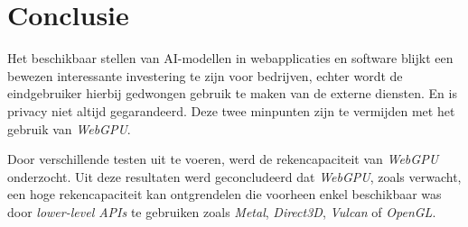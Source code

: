 
\chapter{Conclusie}%
\label{ch:conclusie}





\iffalse
TODO Samen hang moet worden verbetert, alle zaken die hier besproken zijn geweest moeten zeker aan bod zijn gekomen in het onderzoek! Al dan niet verder in detail bespreken.
\fi

Het beschikbaar stellen van AI-modellen in webapplicaties en software blijkt een bewezen interessante investering te zijn voor bedrijven, echter wordt de eindgebruiker hierbij gedwongen gebruik te maken van de externe diensten. En is privacy niet altijd gegarandeerd. Deze twee minpunten zijn te vermijden met het gebruik van \textit{WebGPU}.

\bigbreak{}

Door verschillende testen uit te voeren, werd de rekencapaciteit van \textit{WebGPU} onderzocht. Uit deze resultaten werd geconcludeerd dat \textit{WebGPU}, zoals verwacht, een hoge rekencapaciteit kan ontgrendelen die voorheen enkel beschikbaar was door \textit{lower-level APIs} te gebruiken zoals \textit{Metal}, \textit{Direct3D}, \textit{Vulcan} of \textit{OpenGL}.

